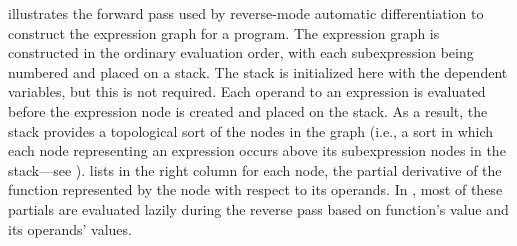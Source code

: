 \documentclass[10pt]{article}
\begin{document}
 illustrates the forward pass used by
reverse-mode automatic differentiation to construct the expression
graph for a program.  The expression graph is constructed in the
ordinary evaluation order, with each subexpression being numbered and
placed on a stack.  The stack is initialized here with the dependent
variables, but this is not required.  Each operand to an expression is
evaluated before the expression node is created and placed on the
stack.  As a result, the stack provides a topological sort of the
nodes in the graph (i.e., a sort in which each node representing an
expression occurs above its subexpression nodes in the stack---see
\citep[Section~2.2.3]{knuth:97}).   lists in
the right column for each node, the partial derivative of the function
represented by the node with respect to its operands.  In
, most of these partials are evaluated lazily during
the reverse pass based on function's value and its operands' values.
\end{document}
